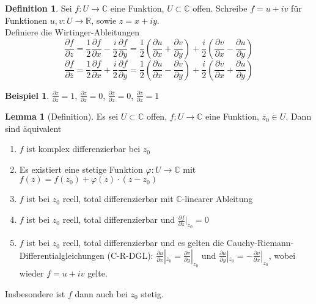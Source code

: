 \documentclass[11pt,titlepage]{article}
\theoremstyle{definition}
\newtheorem{lemma}[theorem]{Lemma}
\newtheorem{definition}[theorem]{Definition}
\newtheorem{example}[theorem]{Beispiel}
\theoremstyle{remark}
\begin{document}
	\begin{definition}
		Sei $f:U\to\mathbb{C}$ eine Funktion, $U\subset\mathbb{C}$ offen. Schreibe $f=u+iv$ für 
		Funktionen $u,v:U\to\mathbb{R}$, sowie $z=x+iy$. \\
		Definiere die Wirtinger-Ableitungen 
		\[ \frac{\partial f}{\partial z}=\frac{1}{2}\frac{\partial f}{\partial x} -\frac{i}{2}\frac{\partial f}{\partial y} 
		=\frac{1}{2} \left(\frac{\partial u}{\partial x}+\frac{\partial v}{\partial y}\right)+\frac{i}{2}\left(
		\frac{\partial v}{\partial x}-\frac{\partial u}{\partial y}\right) \]
		\[ \frac{\partial f}{\partial \overline{z}}=\frac{1}{2} \frac{\partial f}{\partial x} +\frac{i}{2}
		\frac{\partial f}{\partial y}=\frac{1}{2}\left( \frac{\partial u}{\partial x}-\frac{\partial v}{\partial y}\right)
		+\frac{i}{2}\left(\frac{\partial v}{\partial x}+\frac{\partial u}{\partial y}\right) \]
	\end{definition}
	
	\begin{example}
		$\frac{\partial z}{\partial z}=1$, $\frac{\partial z}{\partial \overline{z}}=0$, 
		$\frac{\partial\overline{z}}{\partial z}=0$, $\frac{\partial\overline{z}}{\partial\overline{z}}=1$
	\end{example}
	
	\begin{lemma}[Definition]\label{lem:komplexdiffbar}
		Es sei $U\subset\mathbb{C}$ offen, $f:U\to\mathbb{C}$ eine Funktion, $z_0\in U$. Dann sind 
		äquivalent
		\begin{enumerate}
			\item $f$ ist komplex differenzierbar bei $z_0$
			\item Es existiert eine stetige Funktion $\varphi:U\to\mathbb{C}$ mit $f(z)=f(z_0)+\varphi(z)
			\cdot (z-z_0)$
			\item $f$ ist bei $z_0$ reell, total differenzierbar mit $\mathbb{C}$-linearer Ableitung
			\item $f$ ist bei $z_0$ reell, total differenzierbar und $\frac{\partial f}{\partial \overline{z}}|_
			{z_0}=0$
			\item $f$ ist bei $z_0$ reell, total differenzierbar und es gelten die Cauchy-Riemann-
			Differentialgleichungen (C-R-DGL): 
			$\frac{\partial u}{\partial x}|_{z_0}=\frac{\partial v}{\partial y}|_{z_0}$ 
			und $\frac{\partial u}{\partial y}|_{z_0}=-\frac{\partial v}{\partial x}|_{z_0}$, wobei wieder 
			$f=u+iv$ gelte.
		\end{enumerate}
		Insbesondere ist $f$ dann auch bei $z_0$ stetig.
	\end{lemma}
	
\end{document}
